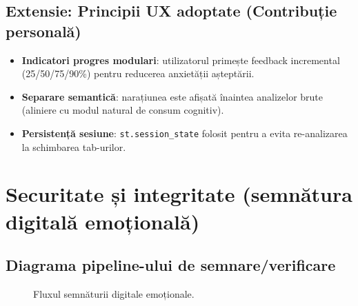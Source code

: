 \subsection*{Extensie: Principii UX adoptate (Contribuție personală)}
\begin{itemize}
  \item \textbf{Indicatori progres modulari}: utilizatorul primește feedback incremental (25/50/75/90\%) pentru reducerea anxietății așteptării.
  \item \textbf{Separare semantică}: narațiunea este afișată înaintea analizelor brute (aliniere cu modul natural de consum cognitiv).
  \item \textbf{Persistență sesiune}: \texttt{st.session\_state} folosit pentru a evita re-analizarea la schimbarea tab-urilor.
\end{itemize}

\section{Securitate și integritate (semnătura digitală emoțională)}\label{sec:c5-security}

\subsection{Diagrama pipeline-ului de semnare/verificare}
\begin{figure}[!htbp]
  \centering
  \caption{Fluxul semnăturii digitale emoționale.}
  \label{fig:c5-wm-flow}
\end{figure}

